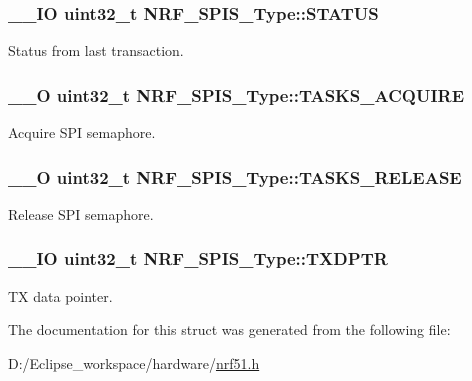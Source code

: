 \subsubsection[{S\+T\+A\+T\+U\+S}]{\setlength{\rightskip}{0pt plus 5cm}\+\_\+\+\_\+\+I\+O uint32\+\_\+t N\+R\+F\+\_\+\+S\+P\+I\+S\+\_\+\+Type\+::\+S\+T\+A\+T\+U\+S}\label{struct_n_r_f___s_p_i_s___type_a273e73e024735898e2b997c33076c32c}
Status from last transaction. \hypertarget{struct_n_r_f___s_p_i_s___type_ae4331f985581654656ba2f2b104834d7}{}
\subsubsection[{T\+A\+S\+K\+S\+\_\+\+A\+C\+Q\+U\+I\+R\+E}]{\setlength{\rightskip}{0pt plus 5cm}\+\_\+\+\_\+\+O uint32\+\_\+t N\+R\+F\+\_\+\+S\+P\+I\+S\+\_\+\+Type\+::\+T\+A\+S\+K\+S\+\_\+\+A\+C\+Q\+U\+I\+R\+E}\label{struct_n_r_f___s_p_i_s___type_ae4331f985581654656ba2f2b104834d7}
Acquire S\+P\+I semaphore. \hypertarget{struct_n_r_f___s_p_i_s___type_af5089c3d27b00a74b94e2f550bd088d0}{}
\subsubsection[{T\+A\+S\+K\+S\+\_\+\+R\+E\+L\+E\+A\+S\+E}]{\setlength{\rightskip}{0pt plus 5cm}\+\_\+\+\_\+\+O uint32\+\_\+t N\+R\+F\+\_\+\+S\+P\+I\+S\+\_\+\+Type\+::\+T\+A\+S\+K\+S\+\_\+\+R\+E\+L\+E\+A\+S\+E}\label{struct_n_r_f___s_p_i_s___type_af5089c3d27b00a74b94e2f550bd088d0}
Release S\+P\+I semaphore. \hypertarget{struct_n_r_f___s_p_i_s___type_a350802ea1da8fbdb8ffb95f4ad8aba4d}{}
\subsubsection[{T\+X\+D\+P\+T\+R}]{\setlength{\rightskip}{0pt plus 5cm}\+\_\+\+\_\+\+I\+O uint32\+\_\+t N\+R\+F\+\_\+\+S\+P\+I\+S\+\_\+\+Type\+::\+T\+X\+D\+P\+T\+R}\label{struct_n_r_f___s_p_i_s___type_a350802ea1da8fbdb8ffb95f4ad8aba4d}
T\+X data pointer. 

The documentation for this struct was generated from the following file\+:\begin{DoxyCompactItemize}
\item 
D\+:/\+Eclipse\+\_\+workspace/hardware/\hyperlink{nrf51_8h}{nrf51.\+h}\end{DoxyCompactItemize}
